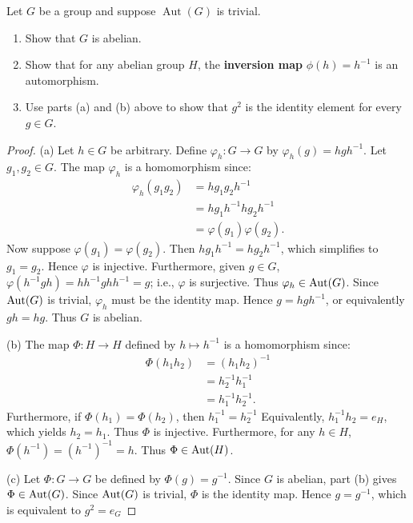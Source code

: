 \documentclass[11pt,twoside,openany]{memoir}
\begin{document}
    \begin{exercise}
        Let $G$ be a group and suppose $\operatorname{Aut}(G)$ is trivial.
            \begin{enumerate}[label=(\alph*)]
                \item Show that $G$ is abelian.
                \item Show that for any abelian group $H$, the {\bfseries inversion map} $\phi(h)=h^{-1}$ is an automorphism.
                \item Use parts (a) and (b) above to show that $g^2$ is the identity element for every $g\in G$.
            \end{enumerate}
    \end{exercise}
        {\color{blue} \begin{proof}
            (a) Let $h \in G$ be arbitrary. Define $\varphi_h:G \rightarrow G$ by $\varphi_h(g) = hgh^{-1}$. Let $g_1,g_2 \in G$. The map $\varphi_h$ is a homomorphism since:
                \begin{equation*}
                \begin{split}
                    \varphi_h(g_1 g_2)
                    & = h g_1 g_2 h^{-1} \\
                    & = h g_1 h^{-1} h g_2 h^{-1} \\
                    & = \varphi(g_1)\varphi(g_2).
                \end{split}
                \end{equation*}
            Now suppose $\varphi(g_1) = \varphi(g_2)$. Then $hg_1h^{-1} = hg_2h^{-1}$, which simplifies to $g_1 = g_2$. Hence $\varphi$ is injective. Furthermore, given $g \in G$, $\varphi(h^{-1}gh) = hh^{-1}ghh^{-1} = g$; i.e., $\varphi$ is surjective. Thus $\varphi_h \in \operatorname{Aut}(G)$. Since $\operatorname{Aut}(G)$ is trivial, $\varphi_h$ must be the identity map. Hence $g = hgh^{-1}$, or equivalently $gh = hg$. Thus $G$ is abelian.

            (b) The map $\Phi:H \rightarrow H$ defined by $h \mapsto h^{-1}$ is a homomorphism since:
                \begin{equation*}
                \begin{split}
                    \Phi(h_1 h_2)
                    & = (h_1h_2)^{-1} \\
                    & = h_2^{-1}h_1^{-1} \\
                    & = h_1^{-1}h_2^{-1}.
                \end{split}
                \end{equation*}
            Furthermore, if $\Phi(h_1) = \Phi(h_2)$, then $h_1^{-1} = h_2^{-1}$ Equivalently, $h_1^{-1}h_2 = e_H$, which yields $h_2 = h_1$. Thus $\Phi$ is injective. Furthermore, for any $h \in H$, $\Phi(h^{-1}) = (h^{-1})^{-1} = h$. Thus $\Phi \in \operatorname{Aut}(H)$.

            (c) Let $\Phi:G \rightarrow G$ be defined by $\Phi(g) = g^{-1}$. Since $G$ is abelian, part (b) gives $\Phi \in \operatorname{Aut}(G)$. Since $\operatorname{Aut}(G)$ is trivial, $\Phi$ is the identity map. Hence $g = g^{-1}$, which is equivalent to $g^2 = e_G$
        \end{proof}}
\end{document}

